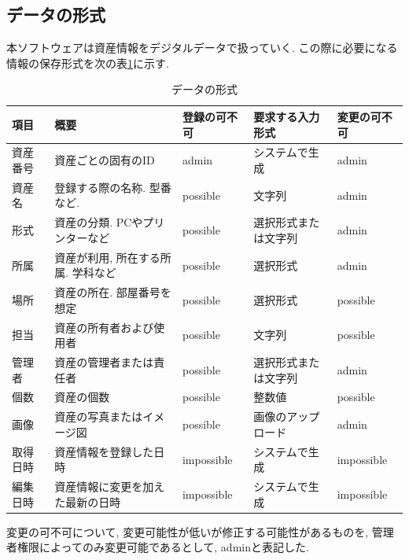 \documentclass[11ptm]{jsarticle}
\begin{document}
\subsection{データの形式}
\label{subsec:データの形式}
本ソフトウェアは資産情報をデジタルデータで扱っていく. この際に必要になる情報の保存形式を次の表\ref{tb:データの形式}に示す.
\begin{table}[h]
  \caption{データの形式}
  \label{tb:データの形式}
  \centering
  \begin{tabular}{@{}l|l|l|l|l@{}}
    項目     & 概要                               & 登録の可不可 & 要求する入力形式     & 変更の可不可 \\
    \hline\hline
    資産番号 & 資産ごとの固有のID                 & admin   & システムで生成       & admin   \\
    \hline
    資産名   & 登録する際の名称. 型番など.        & possible     & 文字列               & admin        \\
    \hline
    形式     & 資産の分類. PCやプリンターなど     & possible     & 選択形式または文字列 & admin        \\
    \hline
    所属     & 資産が利用, 所在する所属. 学科など & possible     & 選択形式             & admin        \\
    \hline
    場所     & 資産の所在. 部屋番号を想定         & possible     & 選択形式             & possible     \\
    \hline
    担当     & 資産の所有者および使用者           & possible     & 文字列               & possible     \\
    \hline
    管理者   & 資産の管理者または責任者           & possible     & 選択形式または文字列 & admin        \\
    \hline
    個数     & 資産の個数                         & possible     & 整数値               & possible        \\
    \hline
    画像     & 資産の写真またはイメージ図         & possible     & 画像のアップロード   & admin        \\
    \hline\hline
    取得日時 & 資産情報を登録した日時             & impossible   & システムで生成       & impossible   \\
    \hline
    編集日時 & 資産情報に変更を加えた最新の日時   & impossible   & システムで生成       & impossible
  \end{tabular}
\end{table}\par
変更の可不可について, 変更可能性が低いが修正する可能性があるものを, 管理者権限によってのみ変更可能であるとして, adminと表記した.
\end{document}
